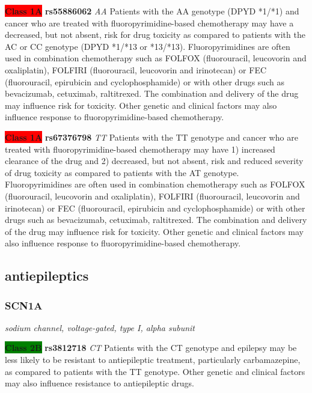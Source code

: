 \documentclass{report}
\begin{document}
\textbf{\colorbox{red} {Class 1A}} \textbf{ rs55886062 } \textit{ AA }
Patients with the AA genotype (DPYD *1/*1) and cancer who are treated with fluoropyrimidine-based chemotherapy may have a decreased, but not absent, risk for drug toxicity as compared to patients with the AC or CC genotype (DPYD *1/*13 or *13/*13). Fluoropyrimidines are often used in combination chemotherapy such as FOLFOX (fluorouracil, leucovorin and oxaliplatin), FOLFIRI (fluorouracil, leucovorin and irinotecan) or FEC (fluorouracil, epirubicin and cyclophosphamide) or with other drugs such as bevacizumab, cetuximab, raltitrexed. The combination and delivery of the drug may influence risk for toxicity. Other genetic and clinical factors may also influence response to fluoropyrimidine-based chemotherapy.\newline

\textbf{\colorbox{red} {Class 1A}} \textbf{ rs67376798 } \textit{ TT }
Patients with the TT genotype and cancer who are treated with fluoropyrimidine-based chemotherapy may have 1) increased clearance of the drug and 2) decreased, but not absent, risk and reduced severity of drug toxicity as compared to patients with the AT genotype. Fluoropyrimidines are often used in combination chemotherapy such as FOLFOX (fluorouracil, leucovorin and oxaliplatin), FOLFIRI (fluorouracil, leucovorin and irinotecan) or FEC (fluorouracil, epirubicin and cyclophosphamide) or with other drugs such as bevacizumab, cetuximab, raltitrexed. The combination and delivery of the drug may influence risk for toxicity. Other genetic and clinical factors may also influence response to fluoropyrimidine-based chemotherapy.\newline





\subsection{ antiepileptics }\subsubsection{ SCN1A }
\textit{ sodium channel, voltage-gated, type I, alpha subunit } \newline





\textbf{\colorbox{green} {Class 2B}} \textbf{ rs3812718 } \textit{ CT }
Patients with the CT genotype and epilepsy may be less likely to be resistant to antiepileptic treatment, particularly carbamazepine, as compared to patients with the TT genotype. Other genetic and clinical factors may also influence resistance to antiepileptic drugs.\newline
\end{document}
